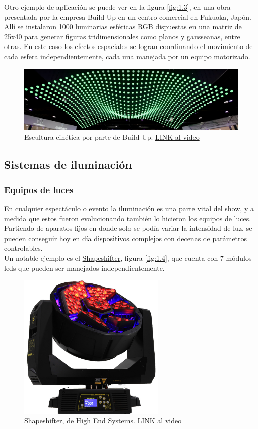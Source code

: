 Otro ejemplo de aplicación se puede ver en la figura \ref{fig:1.3}, en una obra presentada por la empresa Build Up en un centro comercial en Fukuoka, Japón. Allí se instalaron 1000 luminarias esféricas RGB dispuestas en una matriz de 25x40 para generar figuras tridimensionales como planos y gausseanas, entre otras. En este caso los efectos espaciales se logran coordinando el movimiento de cada esfera independientemente, cada una manejada por un equipo motorizado.
\begin{figure}[!ht]
	\centering
	\includegraphics[width=15cm,scale=1]{resources/1_3-kinSculp.png}
	\caption{ Escultura cinética por parte de Build Up. \href{https://www.youtube.com/watch?v=ICixCazf6-k}{LINK al video} }
	\label{fig:\thefigure}
\end{figure}



\subsection{Sistemas de iluminación}
\subsubsection{Equipos de luces}
En cualquier espectáculo o evento la iluminación es una parte vital del show, y a medida que estos fueron evolucionando también lo hicieron los equipos de luces. Partiendo de aparatos fijos en donde solo se podía variar la intensidad de luz, se pueden conseguir hoy en día dispositivos complejos con decenas de parámetros controlables.\\
Un notable ejemplo es el \href{http://preworks.at/index.php/en/products/led-automated-luminairies/shapeshifter}{Shapeshifter}, figura \ref{fig:1.4}, que cuenta con 7 módulos leds que pueden ser manejados independientemente.

\begin{figure}[!ht]
	\centering
	\includegraphics[width=7cm,scale=1]{resources/1_4-shapeshifter.jpg}
	\caption{Shapeshifter, de High End Systems. \href{https://www.youtube.com/watch?v=LIIE3zZscYY}{LINK al video} }
	\label{fig:\thefigure}
\end{figure}

